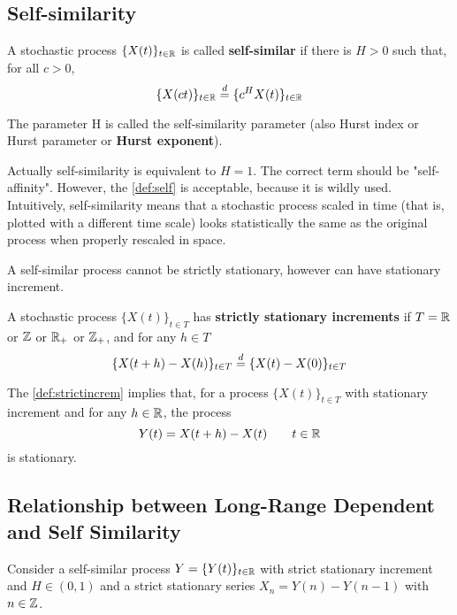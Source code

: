 \subsection{Self-similarity}

\begin{definition}\label{def:self}
	A stochastic process $\{ X(t) \}_{t \in \mathbb{R}}$ is called \textbf{self-similar} if there is $H > 0$ such that, for all $c > 0$,
	\begin{equation}
		\{ X(ct) \}_{t \in \mathbb{R}} \overset{d}{=} \{ c^H X(t) \}_{t \in \mathbb{R}}
	\end{equation}
	
	The parameter H is called the self-similarity parameter (also Hurst index or Hurst parameter or \textbf{Hurst exponent}).
\end{definition}

Actually self-similarity is equivalent to $H = 1$. The correct term should be "self-affinity". However, the \autoref{def:self} is acceptable, because it is wildly used. \\
Intuitively, self-similarity means that a stochastic process scaled in time (that is, plotted with a different time scale) looks statistically the same as the original process when properly rescaled in space. 

A self-similar process cannot be strictly stationary, however can have stationary increment.

\begin{definition}\label{def:strictincrem}
	A stochastic process $\{X (t)\}_{t \in T}$ has \textbf{strictly stationary increments} if $T = \mathbb{R}$ or $\mathbb{Z}$ or $\mathbb{R}_+$ or $\mathbb{Z}_+$, and for any $h \in T$
	\begin{equation}
		\{X(t+h) - X(h)\}_{t \in T} \overset{d}{=} \{X(t) - X(0) \}_{t \in T} 
	\end{equation}
\end{definition}

The \autoref{def:strictincrem} implies that, for a process $\{X (t)\}_{t \in T}$ with stationary increment and for any $h \in \mathbb{R}$, the process
\begin{equation}
	Y(t) = X(t+h) - X(t) \qquad t \in \mathbb{R}
\end{equation}
is stationary.


\subsection{Relationship between Long-Range Dependent and Self Similarity}
Consider a self-similar process $Y = \{ Y(t )\}_{t \in \mathbb{R}}$ with strict stationary increment and $H \in (0, 1)$ and a strict stationary series $X_n = Y(n) - Y(n-1)$ with $n \in \mathbb{Z}$.

